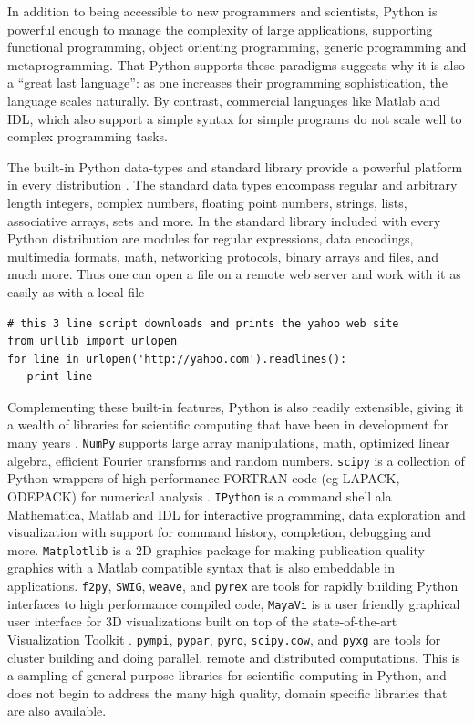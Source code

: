 \noindent In addition to being accessible to new programmers and scientists,
Python is powerful enough to manage the complexity of large applications,
supporting functional programming, object orienting programming, generic
programming and metaprogramming. That Python supports these paradigms
suggests why it is also a {}``great last language'': as one increases
their programming sophistication, the language scales naturally. By
contrast, commercial languages like Matlab and IDL, which also support
a simple syntax for simple programs do not scale well to complex programming
tasks.

The built-in Python data-types and standard library provide a powerful
platform in every distribution \cite{PyLibRef,Lundh2001}. The standard
data types encompass regular and arbitrary length integers, complex
numbers, floating point numbers, strings, lists, associative arrays,
sets and more. In the standard library included with every Python
distribution are modules for regular expressions, data encodings,
multimedia formats, math, networking protocols, binary arrays and
files, and much more. Thus one can open a file on a remote web server
and work with it as easily as with a local file \begin{verbatim}
# this 3 line script downloads and prints the yahoo web site
from urllib import urlopen
for line in urlopen('http://yahoo.com').readlines():
   print line
\end{verbatim}

Complementing these built-in features, Python is also readily extensible,
giving it a wealth of libraries for scientific computing that have
been in development for many years \cite{Dubois1996b,Dubois1996c}.
\texttt{NumPy} supports large array manipulations, math,
optimized linear algebra, efficient Fourier transforms and random
numbers. \texttt{scipy} is a collection of Python wrappers of high
performance FORTRAN code (eg LAPACK, ODEPACK) for numerical analysis
\cite{LAPACK}. \texttt{IPython} is a command shell ala Mathematica,
Matlab and IDL for interactive programming, data exploration and visualization
with support for command history, completion, debugging and more.
\texttt{Matplotlib} is a 2D graphics package for making publication
quality graphics with a Matlab compatible syntax that is also embeddable
in applications. \texttt{f2py}, \texttt{SWIG}, \texttt{weave}, and
\texttt{pyrex} are tools for rapidly building Python interfaces to
high performance compiled code, \texttt{MayaVi} is a user friendly
graphical user interface for 3D visualizations built on top of the
state-of-the-art Visualization Toolkit \cite{SchroederEtal2002}.
\texttt{pympi}, \texttt{pypar}, \texttt{pyro}, \texttt{scipy.cow},
and \texttt{pyxg} are tools for cluster building and doing parallel,
remote and distributed computations. This is a sampling of general
purpose libraries for scientific computing in Python, and does not
begin to address the many high quality, domain specific libraries
that are also available.

